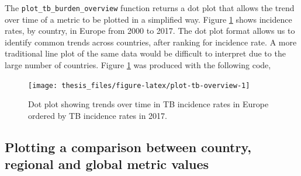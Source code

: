 \documentclass[11pt,twoside]{bristolthesis}
\begin{document}
  The \texttt{plot\_tb\_burden\_overview} function returns a dot plot that allows the trend over time of a metric to be plotted in a simplified way. Figure \ref{fig:plot-tb-overview} shows incidence rates, by country, in Europe from 2000 to 2017. The dot plot format allows us to identify common trends across countries, after ranking for incidence rate. A more traditional line plot of the same data would be difficult to interpret due to the large number of countries. Figure \ref{fig:plot-tb-overview} was produced with the following code,
  \begin{Shaded}
  \begin{Highlighting}[]
  \NormalTok{(} \NormalTok{,}
                           \NormalTok{,}
                           \NormalTok{,}
                           \NormalTok{,}
                           \NormalTok{)}
  \end{Highlighting}
  \end{Shaded}
  \begin{figure}
  
  {\centering \texttt{[image: thesis\_files/figure-latex/plot-tb-overview-1]} 
  
  }
  
  \caption{Dot plot showing trends over time in TB incidence rates in Europe ordered by TB incidence rates in 2017. }\label{fig:plot-tb-overview}
  \end{figure}
  \hypertarget{gettbinr-plot-sum}{%
  \subsection{Plotting a comparison between country, regional and global metric values}\label{gettbinr-plot-sum}}
  
\end{document}
